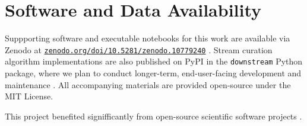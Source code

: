 \section{Software and Data Availability}
\label{sec:materials}

Suppporting software and executable notebooks for this work are available via Zenodo at \href{https://zenodo.org/doi/10.5281/zenodo.10779240}{\texttt{zenodo.org/doi/10.5281/zenodo.10779240}} \citep{moreno2024hsurf}.
Stream curation algorithm implementations are also published on PyPI in the \texttt{downstream} Python package, where we plan to conduct longer-term, end-user-facing development and maintenance \citep{moreno2024downstream}.
All accompanying materials are provided open-source under the MIT License.

This project benefited signifficantly from open-source scientific software projects \citep{2020SciPy-NMeth,harris2020array,reback2020pandas,mckinney-proc-scipy-2010,waskom2021seaborn,hunter2007matplotlib,moreno2023teeplot}.
